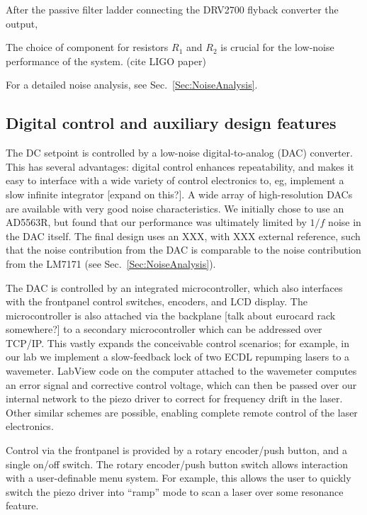 \documentclass[aip,rsi,reprint]{revtex4-1} %
\begin{document}
After the passive filter ladder connecting the DRV2700 flyback converter the output,

The choice of component for resistors $R_1$ and $R_2$ is crucial for the low-noise performance of the system. (cite LIGO paper)

For a detailed noise analysis, see Sec.~\ref{Sec:NoiseAnalysis}.

\subsection{Digital control and auxiliary design features}
\label{Sec:DigControlAuxDesign}

The DC setpoint is controlled by a low-noise digital-to-analog (DAC) converter.
This has several advantages: digital control enhances repeatability, and makes it easy to interface with a wide variety of control electronics to, eg, implement a slow infinite integrator [expand on this?]. 
A wide array of high-resolution DACs are available with very good noise characteristics.
We initially chose to use an AD5563R, but found that our performance was ultimately limited by $1/f$ noise in the DAC itself.
The final design uses an XXX, with XXX external reference, such that the noise contribution from the DAC is comparable to the noise contribution from the LM7171 (see Sec.~\ref{Sec:NoiseAnalysis}).

The DAC is controlled by an integrated microcontroller, which also interfaces with the frontpanel control switches, encoders, and LCD display.
The microcontroller is also attached via the backplane [talk about eurocard rack somewhere?] to a secondary microcontroller which can be addressed over TCP/IP.
This vastly expands the conceivable control scenarios; for example, in our lab we implement a slow-feedback lock of two ECDL repumping lasers to a wavemeter. 
LabView code on the computer attached to the wavemeter computes an error signal and corrective control voltage, which can then be passed over our internal network to the piezo driver to correct for frequency drift in the laser.
Other similar schemes are possible, enabling complete remote control of the laser electronics.

Control via the frontpanel is provided by a rotary encoder/push button, and a single on/off switch.
The rotary encoder/push button switch allows interaction with a user-definable menu system.
For example, this allows the user to quickly switch the piezo driver into ``ramp'' mode to scan a laser over some resonance feature.
\end{document}

